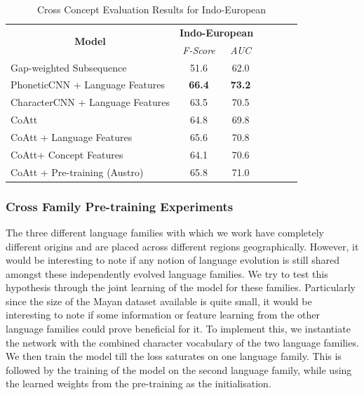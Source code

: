 \documentclass[11pt,letterpaper]{article}
\begin{document}
\begin{table}[t]
\centering
\begin{tabular}{lcccccc}
\multicolumn{1}{c}{\multirow{2}{*}{\textbf{Model}}} & \multicolumn{2}{c}{\textbf{Indo-European}} \\ \cline{2-3} 
\multicolumn{1}{c}{}                                & \textit{F-Score}      & \textit{AUC}    \\ \hline
Gap-weighted Subsequence                            & 51.6                  & 62.0            \\ \hline
PhoneticCNN + Language Features                     & \textbf{66.4}         & \textbf{73.2}   \\
CharacterCNN + Language Features                    & 63.5                  & 70.5            \\ \hline
CoAtt                                               & 64.8                  & 69.8            \\
CoAtt + Language Features                           & 65.6                  & 70.8            \\
CoAtt+ Concept Features                             & 64.1                  & 70.6            \\
CoAtt + Pre-training (Austro)                       & 65.8                  & 71.0 
\end{tabular}
\label{CC_res}
\caption{Cross Concept Evaluation Results for Indo-European}
\end{table}

\subsubsection*{Cross Family Pre-training Experiments}

The three different language families with which we work have completely different origins and are placed across different regions geographically. However, it would be interesting to note if any notion of language evolution is still shared amongst these independently evolved language families. We try to test this hypothesis through the joint learning of the model for these families. Particularly since the size of the Mayan dataset available is quite small, it would be interesting to note if some information or feature learning from the other language families could prove beneficial for it. To implement this, we instantiate the network with the combined character vocabulary of the two language families. We then train the model till the loss saturates on one language family. This is followed by the training of the model on the second language family, while using the learned weights from the pre-training as the initialisation. 
\end{document}
